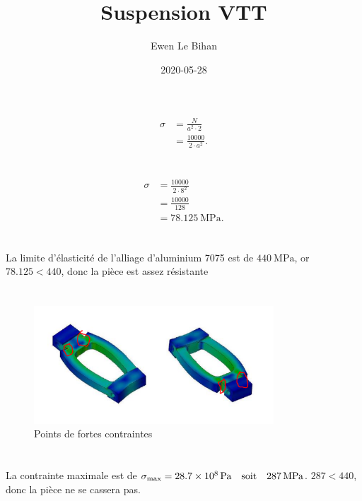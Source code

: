 \documentclass{article}
\title{Suspension VTT}
\author{Ewen Le Bihan}
\date{2020-05-28}
\begin{document}
\maketitle

\section{}

\begin{align*}
	\sigma&= \frac{N}{a^2\cdot 2} \\
	      &= \frac{10 000}{2\cdot a^2}
.\end{align*}

\section{}

\begin{align*}
	\sigma&= \frac{10000}{2\cdot 8^2} \\
	      &= \frac{10000}{128} \\
	      &= \SI{78.125}{\mega\pascal}
.\end{align*}


\section{}

La limite d'élasticité de l'alliage d'aluminium 7075 est de $\SI{440}{\mega\pascal}$, or $78.125 < 440$, donc la pièce est assez résistante

\section{}

\begin{figure}[h]
	\centering
	\includegraphics[width=0.8\textwidth]{points-de-fortes-contraintes.png}
	\caption{Points de fortes contraintes}
	\label{fig:points-de-fortes-contraintes}
\end{figure}

\section{}
La contrainte maximale est de $\sigma_{\text{max}} = \SI{28.7E8}{\pascal} \quad\text{soit}\quad \SI{287}{\mega\pascal}$. $287 < 440$, donc la pièce ne se cassera pas.
\end{document}
